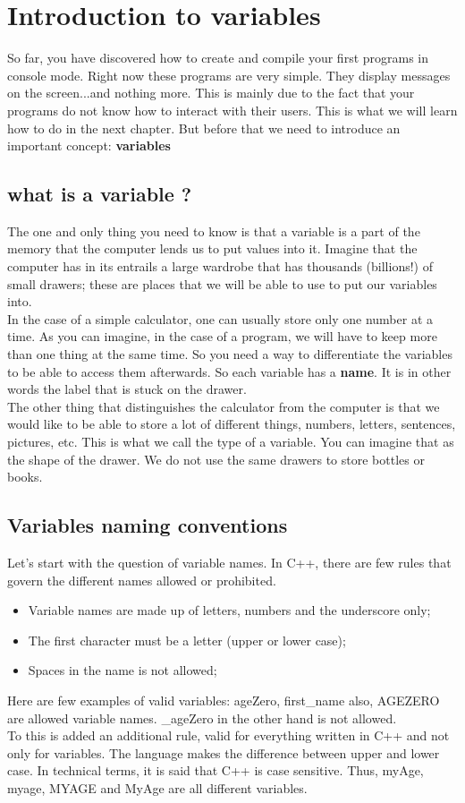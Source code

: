 \documentclass[11pt, a4paper]{article}
\begin{document}
\newpage
\section{Introduction to variables}
So far, you have discovered how to create and compile your first programs in console mode.
Right now these programs are very simple. They display messages on the screen...and nothing
more. This is mainly due to the fact that your programs do not know how to interact
with their users. This is what we will learn how to do in the next chapter. But before that we need
to introduce an important concept: \textbf{variables}

\subsection{what is a variable ?}
The one and only thing you need to know is that a variable is a part of the memory that the computer
lends us to put values into it. Imagine that the computer has in its entrails a large wardrobe that
has thousands (billions!) of small drawers; these are places that we will be able to
use to put our variables into.\\
In the case of a simple calculator, one can usually store only one number at a time. As you can
imagine, in the case of a program, we will have to keep more than one thing at the same time.
So you need a way to differentiate the variables to be able to access them afterwards.
So each variable has a \textbf{name}. It is in other words the label that is stuck on the drawer.
\\The other thing that distinguishes the calculator from the computer is that we would like to
be able to store a lot of different things, numbers, letters, sentences, pictures, etc.
This is what we call the type of a variable. You can imagine that as the shape of the drawer.
We do not use the same drawers to store bottles or books.

\subsection{Variables naming conventions}
Let’s start with the question of variable names. In C++, there are few rules that
govern the different names allowed or prohibited.
\begin{itemize}
\item Variable names are made up of letters, numbers and the underscore only;
\item The first character must be a letter (upper or lower case);
\item Spaces in the name is not allowed;
\end{itemize}
Here are few examples of valid variables: ageZero, first\_name also, AGEZERO are
allowed variable names. \_ageZero in the other hand is not allowed.\\
To this is added an additional rule, valid for everything written in C++ and not
only for variables. The language makes the difference between upper and lower case.
In technical terms, it is said that C++ is case sensitive. Thus, myAge, myage, MYAGE and
MyAge are all different variables.\\
\end{document}
